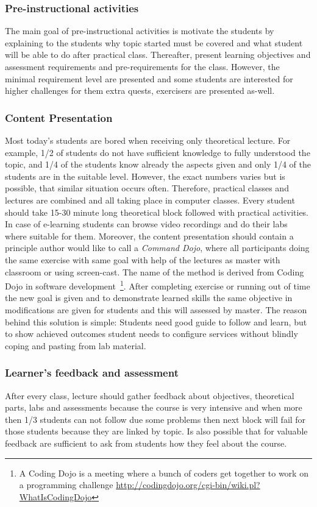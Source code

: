 \subsubsection{Pre-instructional activities}
The main goal of pre-instructional activities is motivate the students by explaining to the students why topic started must be covered and what student will be able to do after practical class. Thereafter, present learning objectives and assessment requirements and pre-requirements for the class. However, the minimal requirement level are presented and some students are interested for higher challenges for them extra quests, exercisers are presented as-well.


\subsubsection{Content Presentation}
Most today’s students are bored when receiving only theoretical lecture. For example, 1/2 of students do not have sufficient knowledge to fully understood the topic, and 1/4 of the students know already the aspects given and only 1/4 of the students are in the suitable level.  However, the exact numbers varies but is possible, that similar situation occurs often. Therefore, practical classes and lectures are combined and all taking place in computer classes. Every student should take 15-30 minute long theoretical block followed with practical activities. In case of e-learning students can browse video recordings and do their labs where suitable for them. Moreover, the content presentation should contain a principle author would like to call a \emph{Command Dojo}, where all participants doing the same exercise with same goal with help of the lectures as master with classroom or using screen-cast. The name of the method is derived from \gls{Coding Dojo} in software development~\footnote{A Coding Dojo is a meeting where a bunch of coders get together to work on a programming challenge \url{http://codingdojo.org/cgi-bin/wiki.pl?WhatIsCodingDojo}}.
After completing exercise or running out of time the new goal is given and to demonstrate learned skills the same objective in modifications are given for students and this will assessed by master. The reason behind this solution is simple: Students need good guide to follow and learn, but to show achieved outcomes student needs to configure services without blindly coping and pasting from lab material.

\subsubsection{Learner's feedback and assessment}
After every class, lecture should gather feedback about objectives, theoretical parts, labs and assessments because the course is very intensive and when more then 1/3 students can not follow due some problems then next block will fail for those students because they are linked by topic.
Is also possible that for valuable feedback are sufficient to ask from students how they feel about the course.

